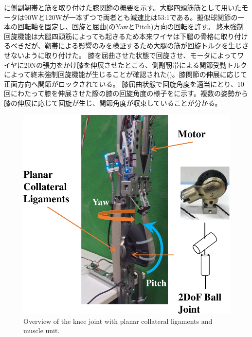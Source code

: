 \documentclass{jarticle}
\begin{document}
に側副靭帯と筋を取り付けた膝関節の概要を示す。大腿四頭筋筋として用いたモータは90Wと120Wが一本ずつで両者とも減速比は53:1である。擬似球関節の一本の回転軸を固定し、回旋と屈曲(のYawとPitch)方向の回転を許す。
終末強制回旋機能は大腿四頭筋によっても起きるため本来ワイヤは下腿の骨格に取り付けるべきだが、靭帯による影響のみを検証するため大腿の筋が回旋トルクを生じさせないように取り付けた。
膝を屈曲させた状態で回旋させ、モータによってワイヤに20Nの張力をかけ膝を伸展させたところ、側副靭帯による関節受動トルクによって終末強制回旋機能が生じることが確認された()。膝関節の伸展に応じて正面方向へ関節がロックされている。
膝屈曲状態で回旋角度を適当にとり、10回にわたって膝を伸展させた際の膝の回旋角度の様子をに示す。複数の姿勢から膝の伸展に応じて回旋が生じ、関節角度が収束していることが分かる。

\begin{figure}[tb]
 \centering
  \includegraphics[width=1.0\columnwidth]{figs/ovv-of-robot.pdf}
  \vspace*{-4mm}
  \caption{Overview of the knee joint with planar collateral ligaments and muscle unit.}
  \label{fig:ovv-knee}
\end{figure}

\end{document}
